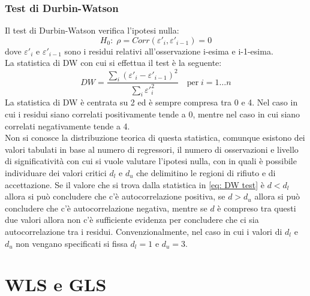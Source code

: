 \documentclass[]{article}
\begin{document}
\subsubsection{Test di Durbin-Watson}
Il test di Durbin-Watson verifica l'ipotesi nulla:
\begin{equation}
H_0:\; \rho = Corr(\varepsilon'_i, \varepsilon'_{i-1}) = 0
\end{equation}
dove $\varepsilon'_i$ e $\varepsilon'_{i-1}$ sono i residui relativi all'osservazione i-esima e i-1-esima.\\
La statistica di DW con cui si effettua il test è la seguente:
\begin{equation}
DW = \frac{\sum_{i}(\varepsilon'_i - \varepsilon'_{i-1})^2}{\sum_{i} \varepsilon'^2_{i}} \quad \text{per}\; i = 1 \dots n
\label{eq: DW test}
\end{equation}
La statistica di DW è centrata su 2 ed è sempre compresa tra 0 e 4. Nel caso in cui i residui siano correlati positivamente tende a 0, mentre nel caso in cui siano correlati negativamente tende a 4.\\
Non si conosce la distribuzione teorica di questa statistica, comunque esistono dei valori tabulati in base al numero di regressori, il numero di osservazioni e livello di significatività con cui si vuole valutare l'ipotesi nulla, con in quali è possibile individuare dei valori critici $d_l$ e $d_u$ che delimitino le regioni di rifiuto e di accettazione. Se il valore che si trova dalla statistica in \eqref{eq: DW test} è $d < d_l$ allora si può concludere che c'è autocorrelazione positiva, se $d > d_u$ allora si può concludere che c'è autocorrelazione negativa, mentre se $d$ è compreso tra questi due valori allora non c'è sufficiente evidenza per concludere che ci sia autocorrelazione tra i residui. Convenzionalmente, nel caso in cui i valori di $d_l$ e $d_u$ non vengano specificati si fissa $d_l = 1$ e $d_u = 3$.

\section{WLS e GLS}
\end{document}
